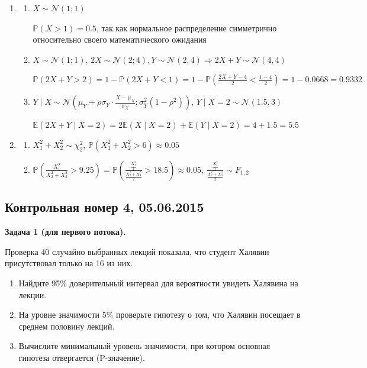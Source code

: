 \documentclass[12pt, a4paper]{article}\usepackage[]{graphicx}\usepackage[]{color}
\begin{document}
\begin{enumerate}
	\item 
		\begin{enumerate}
			\item $X \sim \mathcal{N} (1;1)$
			
			$\mathbb{P}(X>1) = 0.5$, так как нормальное распределение симметрично относительно своего математического ожидания
			
			\item $X \sim \mathcal{N} (1;1)$, $2X \sim \mathcal{N}(2; 4), Y \sim \mathcal{N}(2, 4) \Rightarrow 2X+Y \sim \mathcal{N} (4, 4)$
			
			$\mathbb{P}(2X+Y > 2) = 1 - \mathbb{P}(2X+Y < 1) = 1 - \mathbb{P}\left(\frac{2X+Y - 4}{2} < \frac{1-4}{2}\right) = 1 - 0.0668 = 0.9332$
			
			\item $Y \mid X \sim \mathcal{N}\left(\mu_Y + \rho\sigma_Y\cdot\frac{X-\mu_X}{\sigma_X}; \sigma_Y^2(1-\rho^2)\right)$, $Y \mid X=2 \sim \mathcal{N}(1.5, 3)$
			
			$\mathbb{E}(2X+Y \mid X=2) = 2\mathbb{E} (X\mid X=2) + \mathbb{E}(Y\mid X=2) = 4 + 1.5 = 5.5$
		\end{enumerate}
		
	\item
		\begin{enumerate}
			\item $X_1^2 + X_2^2 \sim \chi^2_2$, $\mathbb{P}(X_1^2 + X_2^2 > 6)  \approx 0.05$
			\item $\mathbb{P}\left(\frac{X_1^2}{X_2^2+X_3^2} > 9.25\right) = \mathbb{P}\left(\frac{\frac{X_1^2}{1}}{\frac{X_2^2+X_3^2}{2}} > 18.5\right) \approx 0.05$, $\frac{\frac{X_1^2}{1}}{\frac{X_2^2+X_3^2}{2}} \sim F_{1, 2}$
		\end{enumerate}
\end{enumerate}

\subsection{Контрольная номер 4, 05.06.2015}


\textbf{Задача 1 (для первого потока).}

Проверка  40 случайно выбранных лекций показала, что студент Халявин присутствовал только на 16 из них.
\begin{enumerate}
\item Найдите 95\% доверительный интервал для вероятности увидеть Халявина на лекции.
\item На уровне значимости 5\% проверьте гипотезу о том, что Халявин посещает в среднем половину лекций.
\item Вычислите минимальный уровень значимости, при котором основная гипотеза отвергается (P-значение).
\end{enumerate}
\end{document}
